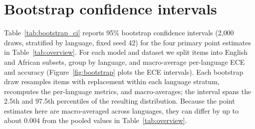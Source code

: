 \documentclass[pmlr]{jmlr}%
\begin{document}
\section{Bootstrap confidence intervals}\label{app:bootstrap}
Table~\ref{tab:bootstrap_ci} reports 95\% bootstrap confidence intervals (2{,}000 draws, stratified
by language, fixed seed 42) for the four primary point estimates in Table~\ref{tab:overview}. For
each model and dataset we split items into English and African subsets, group by language, and
macro-average per-language ECE and accuracy (Figure~\ref{fig:bootstrap} plots the ECE intervals). Each
bootstrap draw resamples items with replacement
within each language stratum, recomputes the per-language metrics, and macro-averages; the interval
spans the 2.5th and 97.5th percentiles of the resulting distribution. Because the point estimates here are
macro-averaged across languages, they can differ by up to about 0.004 from the pooled values in
Table~\ref{tab:overview}.

\begin{table}[H]\centering\small
\setlength{\tabcolsep}{4pt}
\caption{Bootstrap 95\% confidence intervals for ECE and accuracy (zero-shot, 2{,}000 draws,
stratified by language, seed 42). Each cell shows the point estimate [lower, upper].}
\label{tab:bootstrap_ci}
\end{table}
\end{document}
